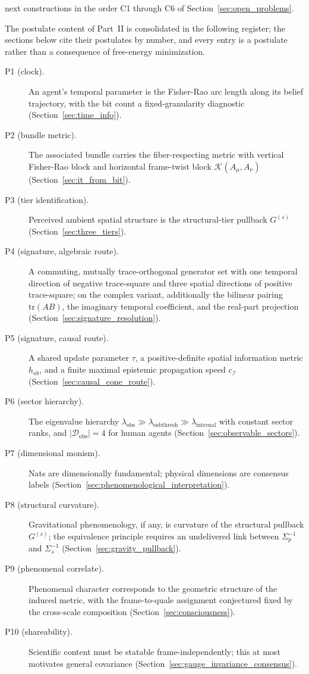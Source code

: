 \documentclass[11pt]{article}
\begin{document}
next constructions in the order C1 through C6 of Section~\ref{sec:open_problems}.

The postulate content of Part~II is consolidated in the following register; the sections below cite their postulates by number, and every entry is a postulate rather than a consequence of free-energy minimization.
\begin{description}
\item[P1 (clock).] An agent's temporal parameter is the Fisher-Rao arc length along its belief trajectory, with the bit count a fixed-granularity diagnostic (Section~\ref{sec:time_info}).
\item[P2 (bundle metric).] The associated bundle carries the fiber-respecting metric with vertical Fisher-Rao block and horizontal frame-twist block $\mathcal{K}(A_\mu, A_\nu)$ (Section~\ref{sec:it_from_bit}).
\item[P3 (tier identification).] Perceived ambient spatial structure is the structural-tier pullback $G^{(s)}$ (Section~\ref{sec:three_tiers}).
\item[P4 (signature, algebraic route).] A commuting, mutually trace-orthogonal generator set with one temporal direction of negative trace-square and three spatial directions of positive trace-square; on the complex variant, additionally the bilinear pairing $\mathrm{tr}(AB)$, the imaginary temporal coefficient, and the real-part projection (Section~\ref{sec:signature_resolution}).
\item[P5 (signature, causal route).] A shared update parameter $\tau$, a positive-definite spatial information metric $h_{ab}$, and a finite maximal epistemic propagation speed $c_\mathcal{I}$ (Section~\ref{sec:causal_cone_route}).
\item[P6 (sector hierarchy).] The eigenvalue hierarchy $\lambda_{\text{obs}} \gg \lambda_{\text{subthresh}} \gg \lambda_{\text{internal}}$ with constant sector ranks, and $|\mathcal{D}_{\text{obs}}| = 4$ for human agents (Section~\ref{sec:observable_sectors}).
\item[P7 (dimensional monism).] Nats are dimensionally fundamental; physical dimensions are consensus labels (Section~\ref{sec:phenomenological_interpretation}).
\item[P8 (structural curvature).] Gravitational phenomenology, if any, is curvature of the structural pullback $G^{(s)}$; the equivalence principle requires an undelivered link between $\Sigma_p^{-1}$ and $\Sigma_s^{-1}$ (Section~\ref{sec:gravity_pullback}).
\item[P9 (phenomenal correlate).] Phenomenal character corresponds to the geometric structure of the induced metric, with the frame-to-quale assignment conjectured fixed by the cross-scale composition (Section~\ref{sec:consciousness}).
\item[P10 (shareability).] Scientific content must be statable frame-independently; this at most motivates general covariance (Section~\ref{sec:gauge_invariance_consensus}).
\end{description}
\end{document}
